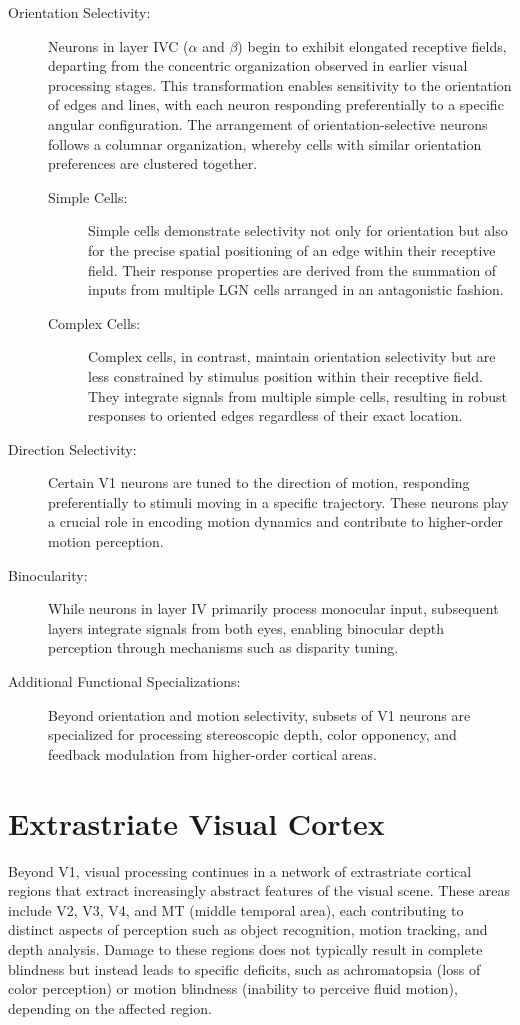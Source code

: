 \begin{description}
    \item[Orientation Selectivity:] Neurons in layer IVC ($\alpha$ and $\beta$) begin to 
    exhibit elongated receptive fields, departing from the concentric organization observed 
    in earlier visual processing stages. This transformation enables sensitivity to the 
    orientation of edges and lines, with each neuron responding preferentially to a specific 
    angular configuration. The arrangement of orientation-selective neurons follows a columnar 
    organization, whereby cells with similar orientation preferences are clustered together.
    \begin{description}
        \item[Simple Cells:] Simple cells demonstrate selectivity not only for orientation 
        but also for the precise spatial positioning of an edge within their receptive field. 
        Their response properties are derived from the summation of inputs from multiple LGN 
        cells arranged in an antagonistic fashion.
        \item[Complex Cells:] Complex cells, in contrast, maintain orientation selectivity 
        but are less constrained by stimulus position within their receptive field. They 
        integrate signals from multiple simple cells, resulting in robust responses to 
        oriented edges regardless of their exact location.
    \end{description}
    \item[Direction Selectivity:] Certain V1 neurons are tuned to the direction of motion, 
    responding preferentially to stimuli moving in a specific trajectory. These neurons play a 
    crucial role in encoding motion dynamics and contribute to higher-order motion perception.
    \item[Binocularity:] While neurons in layer IV primarily process monocular input, 
    subsequent layers integrate signals from both eyes, enabling binocular depth perception 
    through mechanisms such as disparity tuning.
    \item[Additional Functional Specializations:] Beyond orientation and motion selectivity, 
    subsets of V1 neurons are specialized for processing stereoscopic depth, color opponency, 
    and feedback modulation from higher-order cortical areas.
\end{description}

\section{Extrastriate Visual Cortex}
\label{sec:extrastriate}
Beyond V1, visual processing continues in a network of extrastriate cortical regions 
that extract increasingly abstract features of the visual scene. These areas include 
V2, V3, V4, and MT (middle temporal area), each contributing to distinct aspects of 
perception such as object recognition, motion tracking, and depth analysis. Damage 
to these regions does not typically result in complete blindness but instead leads to 
specific deficits, such as achromatopsia (loss of color perception) or motion blindness 
(inability to perceive fluid motion), depending on the affected region.

